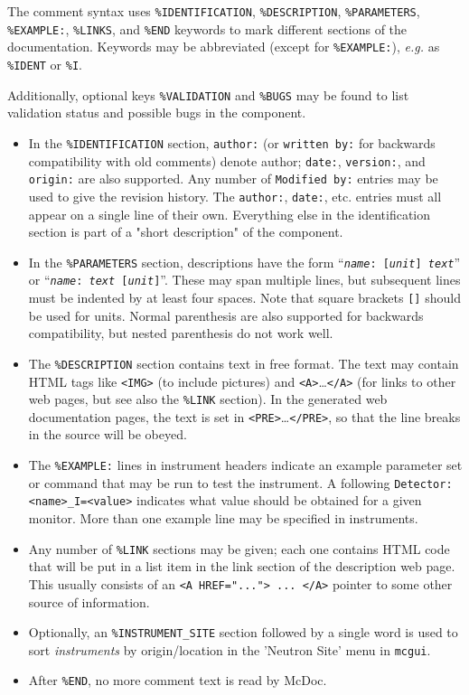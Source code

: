 The comment syntax uses \verb+%IDENTIFICATION+, \verb+%DESCRIPTION+,
\verb+%PARAMETERS+, \verb+%EXAMPLE:+, \verb+%LINKS+, and \verb+%END+
keywords to mark different sections of the documentation. Keywords may
be abbreviated (except for \verb+%EXAMPLE:+), \textit{e.g.} as \verb+%IDENT+ or \verb+%I+.

Additionally, optional keys \verb+%VALIDATION+ and \verb+%BUGS+ may be found to list validation status and possible bugs in the component.

\begin{itemize}
\item In the \verb+%IDENTIFICATION+
  section, \verb+author:+ (or \verb+written by:+ for backwards
  compatibility with old comments) denote author; \verb+date:+,
  \verb+version:+, and \verb+origin:+ are also supported. Any number of
  \verb+Modified by:+ entries may be used to give the revision history.
  The \verb+author:+, \verb+date:+, etc. entries must all
  appear on a single line of their own. Everything else in the
  identification section is part of a "short description" of the
  component.
\item In the \verb+%PARAMETERS+
  section, descriptions have the form
  \hbox{``\texttt{{\it name\/}:~[{\it unit\/}] {\it text\/}}''}
  or \hbox{``\texttt{{\it name\/}:~{\it text\/} [{\it unit\/}]}''}.
  These may span multiple lines, but subsequent lines must be
  indented by at least four spaces. Note that square brackets \verb+[]+ should
  be used for units. Normal parenthesis are also supported for backwards
  compatibility, but nested parenthesis do not work well.
\item The \verb+%DESCRIPTION+
  section contains text in free format. The text may contain HTML tags
  like \verb+<IMG>+ (to include pictures) and
  \verb+<A>+\ldots\verb+</A>+
  (for links to other web pages, but see also the \verb+%LINK+
  section). In the generated web documentation pages, the text is set in
  \verb+<PRE>+\ldots\verb+</PRE>+, so that the line breaks in the source
  will be obeyed.
\item The \verb+%EXAMPLE:+
  lines in instrument headers indicate an example parameter set or command that may be
  run to test the instrument. A following \verb+Detector: <name>_I=<value>+
  indicates what value should be obtained for a given monitor. More than one example
  line may be specified in instruments.
\item Any number of \verb+%LINK+
  sections may be given; each one contains HTML code that will be put in
  a list item in the link section of the description web page. This
  usually consists of an \verb+<A HREF="..."> ... </A>+ pointer to some
  other source of information.
\item Optionally, an \verb+%INSTRUMENT_SITE+ section followed by a single word is used to sort \emph{instruments} by origin/location in the 'Neutron Site' menu in \verb+mcgui+.
\item After \verb+%END+, no more comment text is read by McDoc.
\end{itemize}

